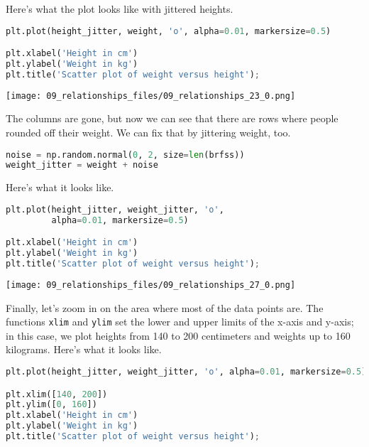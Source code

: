 Here's what the plot looks like with jittered heights.

\begin{lstlisting}[language=Python,style=source]
plt.plot(height_jitter, weight, 'o', alpha=0.01, markersize=0.5)

plt.xlabel('Height in cm')
plt.ylabel('Weight in kg')
plt.title('Scatter plot of weight versus height');
\end{lstlisting}

\begin{center}
\texttt{[image: 09\_relationships\_files/09\_relationships\_23\_0.png]}
\end{center}

The columns are gone, but now we can see that there are rows where
people rounded off their weight. We can fix that by jittering weight,
too.

\begin{lstlisting}[language=Python,style=source]
noise = np.random.normal(0, 2, size=len(brfss))
weight_jitter = weight + noise
\end{lstlisting}

Here's what it looks like.

\begin{lstlisting}[language=Python,style=source]
plt.plot(height_jitter, weight_jitter, 'o',
         alpha=0.01, markersize=0.5)

plt.xlabel('Height in cm')
plt.ylabel('Weight in kg')
plt.title('Scatter plot of weight versus height');
\end{lstlisting}

\begin{center}
\texttt{[image: 09\_relationships\_files/09\_relationships\_27\_0.png]}
\end{center}

Finally, let's zoom in on the area where most of the data points are.
The functions \passthrough{\lstinline!xlim!} and
\passthrough{\lstinline!ylim!} set the lower and upper limits of the
x-axis and y-axis; in this case, we plot heights from 140 to 200
centimeters and weights up to 160 kilograms. Here's what it looks like.

\begin{lstlisting}[language=Python,style=source]
plt.plot(height_jitter, weight_jitter, 'o', alpha=0.01, markersize=0.5)

plt.xlim([140, 200])
plt.ylim([0, 160])
plt.xlabel('Height in cm')
plt.ylabel('Weight in kg')
plt.title('Scatter plot of weight versus height');
\end{lstlisting}

